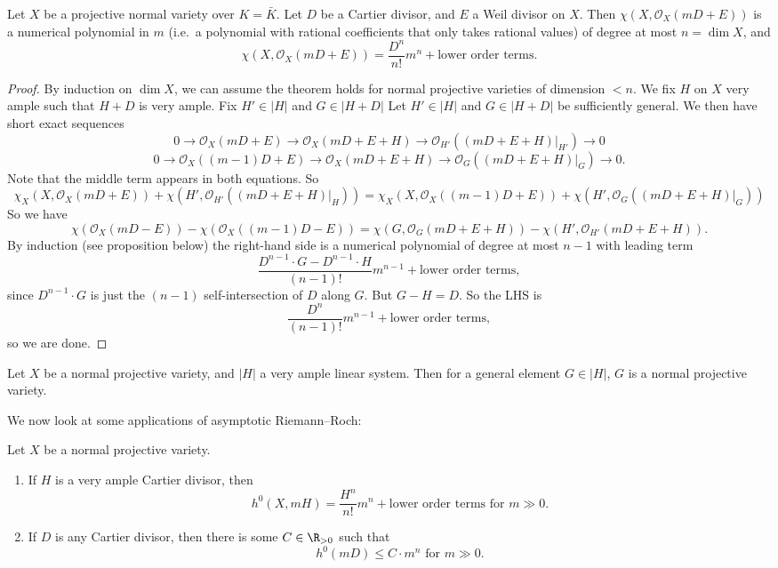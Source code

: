 \documentclass[a4paper]{article}
\begin{document}
\begin{thm}
  Let $X$ be a projective normal variety over $K = \bar{K}$. Let $D$ be a Cartier divisor, and $E$ a Weil divisor on $X$. Then $\chi(X, \mathcal{O}_X(mD + E))$ is a numerical polynomial in $m$ (i.e.\ a polynomial with rational coefficients that only takes rational values) of degree at most $n = \dim X$, and
  \[
    \chi(X, \mathcal{O}_X(mD + E)) = \frac{D^n}{n!} m^n + \text{lower order terms}.
  \]
\end{thm}

\begin{proof}
  By induction on $\dim X$, we can assume the theorem holds for normal projective varieties of dimension $< n$. We fix $H$ on $X$ very ample such that $H + D$ is very ample. Fix $H' \in |H|$ and $G \in |H + D|$ Let $H' \in |H|$ and $G \in |H + D|$ be sufficiently general. We then have short exact sequences
  \[
    0 \to \mathcal{O}_X(mD + E) \to \mathcal{O}_X(mD + E + H) \to \mathcal{O}_{H'}((mD + E + H)|_{H'}) \to 0
  \]
  \[
    0 \to \mathcal{O}_X((m - 1)D + E) \to \mathcal{O}_X(mD + E + H) \to \mathcal{O}_G((mD + E + H)|_G) \to 0.
  \]
  Note that the middle term appears in both equations. So
  \[
    \chi_X(X, \mathcal{O}_X(mD + E)) + \chi (H', \mathcal{O}_{H'}((mD + E + H)|_H)) = \chi_X(X, \mathcal{O}_X((m - 1)D + E)) + \chi (H', \mathcal{O}_{G}((mD + E + H)|_G))
  \]
  So we have
  \[
    \chi(\mathcal{O}_X(mD - E)) - \chi(\mathcal{O}_X((m - 1)D - E)) = \chi(G, \mathcal{O}_G(mD + E + H)) - \chi(H', \mathcal{O}_{H'} (mD + E + H)).
  \]
  By induction (see proposition below) the right-hand side is a numerical polynomial of degree at most $n - 1$ with leading term
  \[
    \frac{D^{n - 1} \cdot G - D^{n - 1} \cdot H}{(n - 1)!} m^{n - 1} + \text{lower order terms},
  \]
  since $D^{n - 1}\cdot G$ is just the $(n-1)$ self-intersection of $D$ along $G$. But $G - H = D$. So the LHS is
  \[
    \frac{D^n}{(n - 1)!} m^{n - 1} + \text{lower order terms},
  \]
  so we are done.
\end{proof}

\begin{prop}
  Let $X$ be a normal projective variety, and $|H|$ a very ample linear system. Then for a general element $G \in |H|$, $G$ is a normal projective variety.\fakeqed
\end{prop}

We now look at some applications of asymptotic Riemann--Roch:
\begin{prop}
  Let $X$ be a normal projective variety.
  \begin{enumerate}
    \item If $H$ is a very ample Cartier divisor, then
      \[
        h^0(X, mH) = \frac{H^n}{n!} m^n + \text{lower order terms}\text{ for }m \gg 0.
      \]
    \item If $D$ is any Cartier divisor, then there is some $C \in \R_{>0}$ such that
    \[
      h^0(mD) \leq C \cdot m^n\text{ for }m \gg 0.
    \]
  \end{enumerate}
\end{prop}
\end{document}
